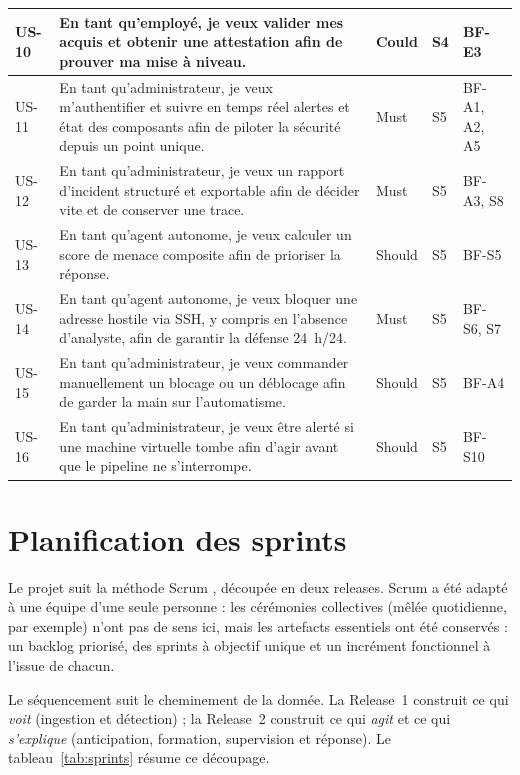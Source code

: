 \begin{xltabular}{\textwidth}{|l|>{\raggedright\arraybackslash}X|l|l|l|}
US-10 & En tant qu'employé, je veux valider mes acquis et obtenir une attestation afin de prouver ma mise à niveau. & Could & S4 & BF-E3 \\ \hline
US-11 & En tant qu'administrateur, je veux m'authentifier et suivre en temps réel alertes et état des composants afin de piloter la sécurité depuis un point unique. & Must & S5 & BF-A1, A2, A5 \\ \hline
US-12 & En tant qu'administrateur, je veux un rapport d'incident structuré et exportable afin de décider vite et de conserver une trace. & Must & S5 & BF-A3, S8 \\ \hline
US-13 & En tant qu'agent autonome, je veux calculer un score de menace composite afin de prioriser la réponse. & Should & S5 & BF-S5 \\ \hline
US-14 & En tant qu'agent autonome, je veux bloquer une adresse hostile via SSH, y compris en l'absence d'analyste, afin de garantir la défense 24~h/24. & Must & S5 & BF-S6, S7 \\ \hline
US-15 & En tant qu'administrateur, je veux commander manuellement un blocage ou un déblocage afin de garder la main sur l'automatisme. & Should & S5 & BF-A4 \\ \hline
US-16 & En tant qu'administrateur, je veux être alerté si une machine virtuelle tombe afin d'agir avant que le pipeline ne s'interrompe. & Should & S5 & BF-S10 \\ \hline

\end{xltabular}
\section{Planification des sprints}
\label{sec:planif}

Le projet suit la méthode Scrum \cite{schwaber2020scrumguide}, découpée en deux releases. Scrum a été adapté à une équipe d'une seule personne : les cérémonies collectives (mêlée quotidienne, par exemple) n'ont pas de sens ici, mais les artefacts essentiels ont été conservés : un backlog priorisé, des sprints à objectif unique et un incrément fonctionnel à l'issue de chacun.

Le séquencement suit le cheminement de la donnée. La Release~1 construit ce qui \textit{voit} (ingestion et détection) ; la Release~2 construit ce qui \textit{agit} et ce qui \textit{s'explique} (anticipation, formation, supervision et réponse). Le tableau~\ref{tab:sprints} résume ce découpage.



